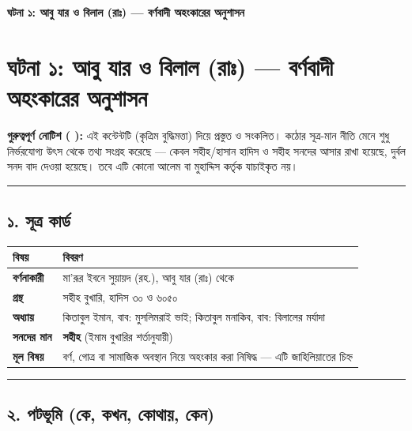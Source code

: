 

\begin{center}{\Large\bfseries\color{emerald} ঘটনা ১: আবু যার ও বিলাল (রাঃ) — বর্ণবাদী অহংকারের অনুশাসন}\end{center}
\vspace{1em}
\section*{ঘটনা ১: আবু যার ও বিলাল (রাঃ) — বর্ণবাদী অহংকারের অনুশাসন}

\begin{warnbox}
 \textbf{গুরুত্বপূর্ণ নোটিশ ( ):} এই কন্টেন্টটি  (কৃত্রিম বুদ্ধিমত্তা) দিয়ে প্রস্তুত ও সংকলিত।  কঠোর সূত্র-মান নীতি মেনে শুধু নির্ভরযোগ্য উৎস থেকে তথ্য সংগ্রহ করেছে — কেবল সহীহ/হাসান হাদিস ও সহীহ সনদের আসার রাখা হয়েছে, দুর্বল সনদ বাদ দেওয়া হয়েছে। তবে এটি কোনো আলেম বা মুহাদ্দিস কর্তৃক যাচাইকৃত নয়।
\end{warnbox}


\medskip\hrule\medskip

\subsection*{১. সূত্র কার্ড}

\begin{table}[h]\centering\small
\begin{tabular}{ll}
বিষয় & বিবরণ \\
\hline
\textbf{বর্ণনাকারী} & মা'রূর ইবনে সুয়ায়দ (রহ.), আবু যার (রাঃ) থেকে \\
\textbf{গ্রন্থ} & সহীহ বুখারি, হাদিস ৩০ ও ৬০৫০ \\
\textbf{অধ্যায়} & কিতাবুল ইমান, বাব: মুসলিমরাই ভাই; কিতাবুল মনাকিব, বাব: বিলালের মর্যাদা \\
\textbf{সনদের মান} & \textbf{সহীহ} (ইমাম বুখারির শর্তানুযায়ী) \\
\textbf{মূল বিষয়} & বর্ণ, গোত্র বা সামাজিক অবস্থান নিয়ে অহংকার করা নিষিদ্ধ — এটি জাহিলিয়াতের চিহ্ন \\
\hline
\end{tabular}
\end{table}

\medskip\hrule\medskip

\subsection*{২. পটভূমি (কে, কখন, কোথায়, কেন)}

